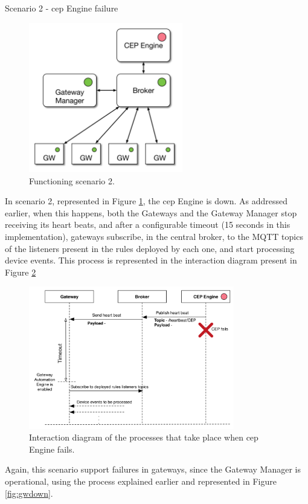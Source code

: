 \begin{Paragraph}{Scenario 2 - \ac{cep} Engine failure}
\begin{figure}[H]
	\centering
	\includegraphics[width=0.6\textwidth]{figures/fs2.png}
	\caption{Functioning scenario 2.}
	\label{fig:fs2}
\end{figure}

In scenario 2, represented in Figure \ref{fig:fs2}, the \ac{cep} Engine is down. As addressed earlier, when this happens, both the Gateways and the Gateway Manager stop receiving its heart beats, and after a configurable timeout (15 seconds in this implementation), gateways subscribe, in the central broker, to the MQTT topics of the listeners present in the rules deployed by each one, and start processing device events. This process is represented in the interaction diagram present in Figure \ref{fig:gae}

\begin{figure}[H]
	\centering
	\includegraphics[width=0.8\textwidth]{figures/gae.png}
	\caption{Interaction diagram of the processes that take place when \ac{cep} Engine fails.}
	\label{fig:gae}
\end{figure}

Again, this scenario support failures in gateways, since the Gateway Manager is operational, using the process explained earlier and represented in Figure \ref{fig:gwdown}.

\end{Paragraph}

